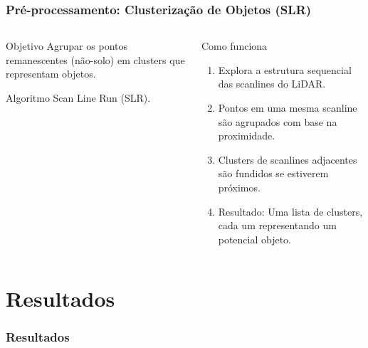 \documentclass[aspectratio=169,t,xcolor=table]{beamer}
\begin{document}
\begin{frame}
    \frametitle{Pré-processamento: Clusterização de Objetos (SLR)}
    \begin{columns}[T]
        \begin{column}{.4\textwidth}
            \begin{block}{Objetivo}
                \vspace{1.5em}
                Agrupar os pontos remanescentes (não-solo) em clusters que representam objetos.
                \vspace{1.5em}
            \end{block}
            \begin{block}{Algoritmo}
                \vspace{1.5em}
                Scan Line Run (SLR).
                \vspace{1.5em}
            \end{block}
        \end{column}
        \begin{column}{.6\textwidth}
            \begin{block}{Como funciona}
                \begin{enumerate}[<+->]
                    \item Explora a estrutura sequencial das scanlines do LiDAR.
                    \item Pontos em uma mesma scanline são agrupados com base na proximidade.
                    \item Clusters de scanlines adjacentes são fundidos se estiverem próximos.
                    \item Resultado: Uma lista de clusters, cada um representando um potencial objeto.
                \end{enumerate}
            \end{block}
        \end{column}
    \end{columns}
\end{frame}

\section{Resultados}

\begin{frame}
    \frametitle{Resultados}
\end{frame}
\end{document}
